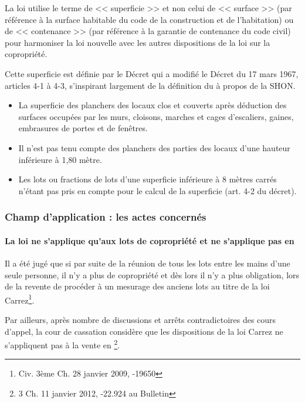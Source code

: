 		La loi utilise le terme de << superficie >> et non celui de << surface >> (par référence à la surface habitable du code
		de la construction et de l'habitation) ou de << contenance >> (par référence à la garantie de contenance du
		code civil) pour harmoniser la loi nouvelle avec les autres dispositions de la loi sur la copropriété.
		
		Cette superficie est définie par le Décret qui a modifié le Décret du 17 mars 1967, articles 4-1 à 4-3,
		s’inspirant largement de la définition du \CCH{} à propos de la SHON.
			\begin{itemize}
				\item La superficie des planchers des locaux clos et couverts après déduction des surfaces occupées par
					les murs, cloisons, marches et cages d'escaliers, gaines, embrasures de portes et de fenêtres.
				\item Il n'est pas tenu compte des planchers des parties des locaux d'une hauteur inférieure à 1,80 mètre.
				\item Les lots ou fractions de lots d'une superficie inférieure à 8 mètres carrés n’étant pas pris en
					compte pour le calcul de la superficie (art. 4-2 du décret).
			\end{itemize}
		
		\subsubsection{Champ d’application : les actes concernés}
		
			\paragraph{La loi ne s’applique qu’aux lots de copropriété et ne s’applique pas en \VEFA{}}
			
			\par Il a été jugé que si par suite de la réunion de tous les lots entre les mains d’une seule personne, il n’y a plus
			de copropriété et dès lors il n’y a plus obligation, lors de la revente de procéder à un mesurage des anciens
			lots au titre de la loi Carrez\footnote{Civ. 3ème Ch. 28 janvier 2009, -19650}.
			
			Par ailleurs, après nombre de discussions et arrêts contradictoires des cours d’appel, la cour de cassation
			considère que les dispositions de la loi Carrez ne s’appliquent pas à la vente en \VEFA\footnote{3\ieme{} Ch. 11 janvier 2012, -22.924 au Bulletin}.
			
